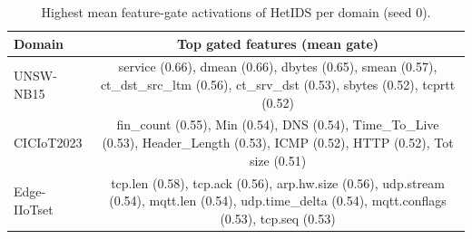 \begin{table}[htbp]\centering\scriptsize
\caption{Highest mean feature-gate activations of HetIDS per domain (seed 0).}
\label{tab:gate}
\begin{tabular}{lc}
\toprule
Domain & Top gated features (mean gate) \\
\midrule
UNSW-NB15 & service (0.66), dmean (0.66), dbytes (0.65), smean (0.57), ct\_dst\_src\_ltm (0.56), ct\_srv\_dst (0.53), sbytes (0.52), tcprtt (0.52) \\
CICIoT2023 & fin\_count (0.55), Min (0.54), DNS (0.54), Time\_To\_Live (0.53), Header\_Length (0.53), ICMP (0.52), HTTP (0.52), Tot size (0.51) \\
Edge-IIoTset & tcp.len (0.58), tcp.ack (0.56), arp.hw.size (0.56), udp.stream (0.54), mqtt.len (0.54), udp.time\_delta (0.54), mqtt.conflags (0.53), tcp.seq (0.53) \\
\bottomrule
\end{tabular}
\end{table}